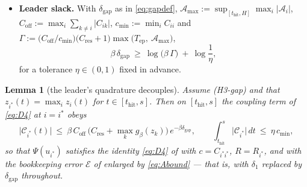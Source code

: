 \documentclass[11pt]{article}
\newtheorem{lemma}[theorem]{Lemma}
\theoremstyle{remark}
\newcommand{\thit}{t_{\mathrm{hit}}}
\newcommand{\Ar}{\mathcal{A}}
\newcommand{\Tep}{T_{\mathrm{ep}}}
\newcommand{\Cres}{C_{\mathrm{res}}}
\newcommand{\dgap}{\delta_{\mathrm{gap}}}
\newcommand{\hyplabel}[1]{\textup{(#1)}}
\begin{document}
\begin{itemize}
\item[\hyplabel{H3-gap}] \textbf{Leader slack.} With $\dgap$ as in
\eqref{eq:gapdef}, $\Ar_{\max}:=\sup_{[\thit,H]}\max_i|\Ar_i|$,
$C_{\mathrm{off}}:=\max_i\sum_{k\ne i}|C_{ik}|$,
$c_{\min}:=\min_iC_{ii}$ and
$\Gamma:=\bigl(C_{\mathrm{off}}/c_{\min}\bigr)\bigl(\Cres+1\bigr)
\max\bigl(\Tep,\ \Ar_{\max}\bigr)$,
\begin{equation}\label{eq:H3gap}
\beta\,\dgap\ \ge\ \log\bigl(\beta\,\Gamma\bigr)\ +\ \log\frac1\eta ,
\end{equation}
for a tolerance $\eta\in(0,1)$ fixed in advance.
\end{itemize}

\begin{lemma}[the leader's quadrature decouples]\label{lem:A1}
Assume \hyplabel{H3-gap} and that $z_{i^\ast}(t)=\max_iz_i(t)$ for
$t\in[\thit,s]$. Then on $[\thit,s]$ the coupling term of \eqref{eq:D4} at
$i=i^\ast$ obeys
\begin{equation}\label{eq:Abound}
\bigl|\mathcal C_{i^\ast}(t)\bigr|
\ \le\ \beta\,C_{\mathrm{off}}\,\bigl(\Cres+\max_kg_\beta(z_k)\bigr)\,
e^{-\beta\dgap},
\qquad
\int_{\thit}^{s}\bigl|\mathcal C_{i^\ast}\bigr|\,dt\ \le\ \eta\,c_{\min},
\end{equation}
so that $\Psi(u_{i^\ast})$ satisfies the identity
\eqref{eq:D4} of \cite[L1$'$]{paper} with $c=C_{i^\ast i^\ast}$,
$R=R_{i^\ast}$, and with the bookkeeping error
$\mathcal E$ of \cite[(B.quadrature)]{paper} enlarged by \eqref{eq:Abound}
--- that is, with $\delta_1$ replaced by $\dgap$ throughout.
\end{lemma}
\end{document}
